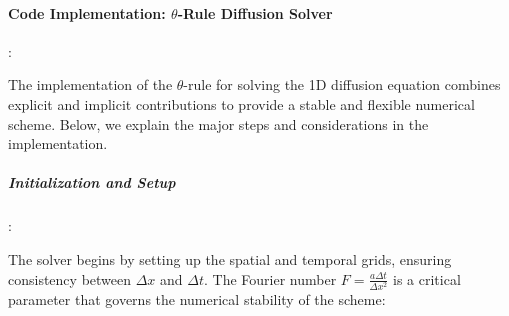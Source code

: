 \documentclass{article}
\begin{document}

			
			
			\paragraph{Code Implementation: \(\theta\)-Rule Diffusion Solver}:
			\newline
			\vspace{0.1em} %
			\newline
						
			The implementation of the \(\theta\)-rule for solving the 1D diffusion equation combines explicit and implicit contributions to provide a stable and flexible numerical scheme. Below, we explain the major steps and considerations in the implementation.
			
			\subparagraph{Initialization and Setup}:
			
			The solver begins by setting up the spatial and temporal grids, ensuring consistency between \(\Delta x\) and \(\Delta t\). The Fourier number \(F = \frac{a \Delta t}{\Delta x^2}\) is a critical parameter that governs the numerical stability of the scheme:
		
\end{document}
